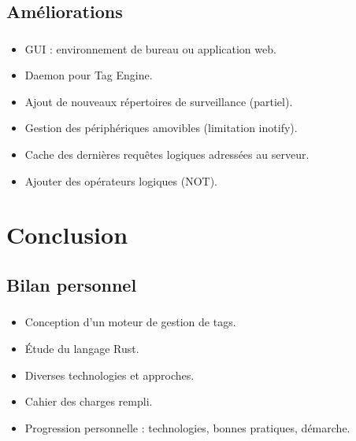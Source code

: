 \documentclass[10pt]{beamer}
\begin{document}
\subsection{Améliorations}
\begin{frame}
    \frametitle{\subsecname}
    \begin{itemize}
        \pause
        \item GUI : environnement de bureau ou application web.
        \pause
        \item Daemon pour Tag Engine.
        \pause
        \item Ajout de nouveaux répertoires de surveillance (partiel).
        \pause
        \item Gestion des périphériques amovibles (limitation inotify).
        \pause
        \item Cache des dernières requêtes logiques adressées au serveur.
        \pause
        \item Ajouter des opérateurs logiques (NOT).
    \end{itemize}
\end{frame}

\section{Conclusion}
\subsection{Bilan personnel}
\begin{frame}
    \frametitle{\subsecname}
    \begin{itemize}
        \pause
        \item Conception d'un moteur de gestion de tags.
        \pause
        \item Étude du langage Rust.
        \pause
        \item Diverses technologies et approches.
        \pause
        \item Cahier des charges rempli.
        \pause
        \item Progression personnelle : technologies, bonnes pratiques, démarche.
    \end{itemize}
\end{frame}

\end{document}
